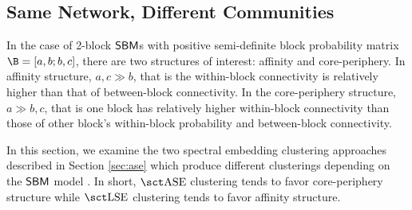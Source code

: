 \subsection{Same Network, Different Communities}
In the case of 2-block $\operatorname{\mathsf{SBM}}$s with positive semi-definite block probability matrix $\B = [a, b;b,c]$, there are two structures of interest: affinity and core-periphery. In affinity structure, $a, c \gg b$, that is the within-block connectivity is relatively higher than that of between-block connectivity. In the core-periphery structure, $a \gg b, c$, that is one block has relatively higher within-block connectivity than those of other block's within-block probability and between-block connectivity.

In this section, we examine the two spectral embedding clustering approaches described in Section \ref{sec:ase} which produce different clusterings depending on the $\operatorname{\mathsf{SBM}}$ model \cite{priebe2019two, cape2019spectral}. In short, $\ase$ clustering tends to favor core-periphery structure while $\lse$ clustering tends to favor affinity structure.

